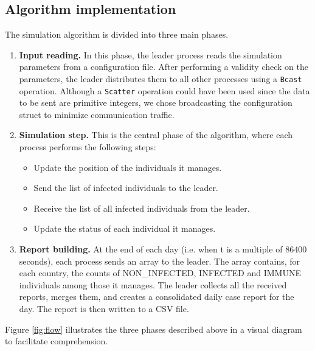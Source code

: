 \documentclass[11pt]{article}
\begin{document}
\subsection{Algorithm implementation}
The simulation algorithm is divided into three main phases.
\begin{enumerate}[label=\textbf{\arabic*.}, leftmargin=*]
        \item \textbf{Input reading.} In this phase, the leader process reads the simulation parameters from a configuration file. After performing a validity check on the parameters, the leader distributes them to all other processes using a \texttt{Bcast} operation. Although a \texttt{Scatter} operation could have been used since the data to be sent are primitive integers, we chose broadcasting the configuration struct to minimize communication traffic. 
    \item \textbf{Simulation step.} This is the central phase of the algorithm, where each process performs the following steps: 
    \begin{itemize}
        \item Update the position of the individuals it manages.
        \item Send the list of infected individuals to the leader.
        \item Receive the list of all infected individuals from the leader.
        \item Update the status of each individual it manages.
    \end{itemize}
    \item \textbf{Report building.} At the end of each day (i.e. when t is a multiple of 86400 seconds), each process sends an array to the leader. The array contains, for each country, the counts of NON\_INFECTED, INFECTED and IMMUNE individuals among those it manages. The leader collects all the received reports, merges them, and creates a consolidated daily case report for the day. The report is then written to a CSV file.
\end{enumerate}
Figure \ref{fig:flow} illustrates the three phases described above in a visual diagram to facilitate comprehension.
\end{document}
